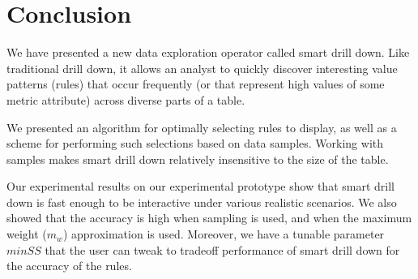 \documentclass[10pt,journal,compsoc]{IEEEtran}
\begin{document}
\section{Conclusion}\label{sec:conclusion}
We have presented a new data exploration operator called smart drill down.
Like traditional drill down, it allows an analyst
to quickly discover interesting value patterns (rules) that occur frequently
(or that represent high values of some metric attribute)
across diverse parts of a table.

We presented an algorithm for optimally selecting rules
to display, as well as a scheme for performing such selections
based on data samples. Working with samples makes smart drill down
relatively insensitive to the size of the table.

Our experimental results on our experimental prototype show that smart drill down
is fast enough to be interactive under various
realistic scenarios. We also showed that the accuracy is high
when sampling is used, and when the maximum weight ($m_w$)
approximation is used. Moreover, we have a tunable parameter $minSS$ that the user can tweak to tradeoff performance of smart drill down for the accuracy of the rules.

				




\vspace{17pt}
\end{document}
